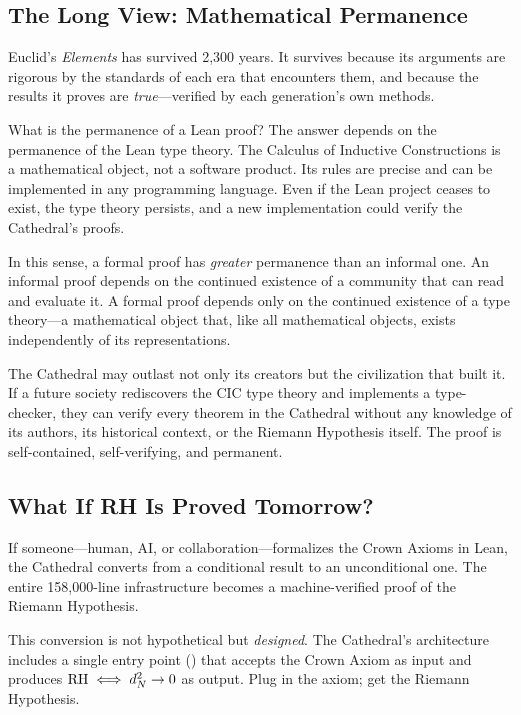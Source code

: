 \subsection{The Long View: Mathematical Permanence}

Euclid's \emph{Elements} has survived 2{,}300 years. It survives
because its arguments are rigorous by the standards of each
era that encounters them, and because the results it proves
are \emph{true}---verified by each generation's own methods.

What is the permanence of a Lean proof? The answer depends on
the permanence of the Lean type theory. The Calculus of Inductive
Constructions is a mathematical object, not a software product.
Its rules are precise and can be implemented in any programming
language. Even if the Lean project ceases to exist, the type
theory persists, and a new implementation could verify the
Cathedral's proofs.

In this sense, a formal proof has \emph{greater} permanence than
an informal one. An informal proof depends on the continued
existence of a community that can read and evaluate it.
A formal proof depends only on the continued existence of
a type theory---a mathematical object that, like all mathematical
objects, exists independently of its representations.

The Cathedral may outlast not only its creators but the
civilization that built it. If a future society rediscovers the
CIC type theory and implements a type-checker, they can verify
every theorem in the Cathedral without any knowledge of its
authors, its historical context, or the Riemann Hypothesis itself.
The proof is self-contained, self-verifying, and permanent.

\subsection{What If RH Is Proved Tomorrow?}

If someone---human, AI, or collaboration---formalizes the Crown
Axioms in Lean, the Cathedral converts from a conditional result
to an unconditional one. The entire 158{,}000-line infrastructure
becomes a machine-verified proof of the Riemann Hypothesis.

This conversion is not hypothetical but \emph{designed}. The
Cathedral's architecture includes a single entry point
() that accepts the Crown Axiom
as input and produces $\mathrm{RH} \iff d_N^2 \to 0$ as output. Plug in
the axiom; get the Riemann Hypothesis.

